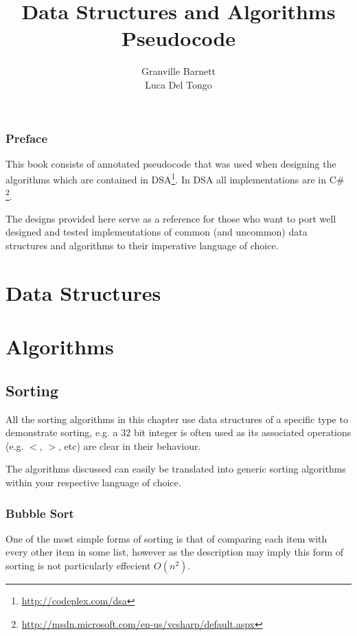 \documentclass[10pt,oneside,a4paper]{report}
\begin{document}
\title{Data Structures and Algorithms\\Pseudocode}
\author{Granville Barnett\\Luca Del Tongo}
\maketitle

\newpage
\tableofcontents
\newpage

\section*{Preface}
This book consists of annotated pseudocode that was used when designing the algorithms which are contained in DSA\footnote{\url{http://codeplex.com/dsa}}. In DSA all implementations are in C\# \footnote{\url{http://msdn.microsoft.com/en-us/vcsharp/default.aspx}}.

The designs provided here serve as a reference for those who want to port well designed and tested implementations of common (and uncommon) data structures and algorithms to their imperative language of choice.

\pagestyle{headings}

\part{Data Structures}

\part{Algorithms}

\chapter{Sorting}
All the sorting algorithms in this chapter use data structures of a specific type to demonstrate sorting, e.g. a $32$ bit integer is often used as its associated operations (e.g. $<$, $>$, etc) are clear in their behaviour.

The algorithms discussed can easily be translated into generic sorting algorithms within your respective language of choice.

\section{Bubble Sort}
One of the most simple forms of sorting is that of comparing each item with every other item in some list, however as the description may imply this form of sorting is not particularly effecient $O(n^{2})$.
\end{document}
